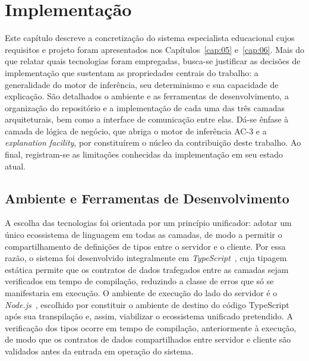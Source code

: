 \chapter{Implementação}
\label{cap:07}

Este capítulo descreve a concretização do sistema especialista educacional cujos requisitos e projeto foram apresentados nos Capítulos~\ref{cap:05} e~\ref{cap:06}. Mais do que relatar quais tecnologias foram empregadas, busca-se justificar as decisões de implementação que sustentam as propriedades centrais do trabalho: a generalidade do motor de inferência, seu determinismo e sua capacidade de explicação. São detalhados o ambiente e as ferramentas de desenvolvimento, a organização do repositório e a implementação de cada uma das três camadas arquiteturais, bem como a interface de comunicação entre elas. Dá-se ênfase à camada de lógica de negócio, que abriga o motor de inferência AC-3 e a \textit{explanation facility}, por constituírem o núcleo da contribuição deste trabalho. Ao final, registram-se as limitações conhecidas da implementação em seu estado atual.

\section{Ambiente e Ferramentas de Desenvolvimento}
\label{sec:ambiente-implementacao}

A escolha das tecnologias foi orientada por um princípio unificador: adotar um único ecossistema de linguagem em todas as camadas, de modo a permitir o compartilhamento de definições de tipos entre o servidor e o cliente. Por essa razão, o sistema foi desenvolvido integralmente em \textit{TypeScript}~\cite{TypeScript}, cuja tipagem estática permite que os contratos de dados trafegados entre as camadas sejam verificados em tempo de compilação, reduzindo a classe de erros que só se manifestaria em execução. O ambiente de execução do lado do servidor é o \textit{Node.js}~\cite{NodeJS}, escolhido por constituir o ambiente de destino do código TypeScript após sua transpilação e, assim, viabilizar o ecossistema unificado pretendido. A verificação dos tipos ocorre em tempo de compilação, anteriormente à execução, de modo que os contratos de dados compartilhados entre servidor e cliente são validados antes da entrada em operação do sistema.

